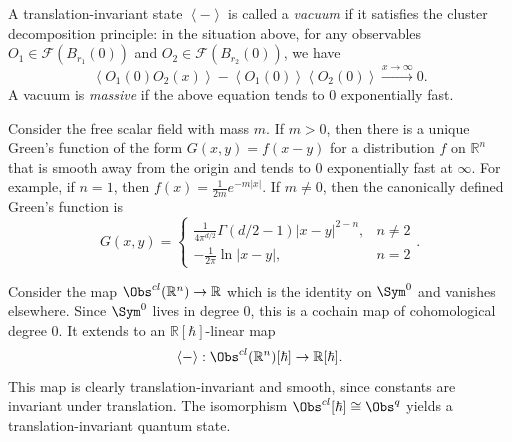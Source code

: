 \begin{definition}\label{dfn:4-9-2}
	A translation-invariant state $\left\langle - \right\rangle $ is called a \emph{vacuum} if it satisfies the cluster decomposition principle: in the situation above, for any observables $O_1\in \mathcal{F} (B_{r_1} (0))$ and $O_2\in \mathcal{F} (B_{r_2} (0))$, we have
	\[
		\left\langle O_1(0)O_2(x) \right\rangle -\left\langle O_1(0) \right\rangle \left\langle O_2(0) \right\rangle \xrightarrow{x\to \infty }0
	.\]
	A vacuum is \emph{massive} if the above equation tends to 0 exponentially fast.
\end{definition}

Consider the free scalar field with mass $m$. If $m>0$, then there is a unique Green's function of the form $G(x,y) = f(x-y)$ for a distribution $f$ on $\mathbb{R} ^n$ that is smooth away from the origin and tends to 0 exponentially fast at $\infty $. For example, if $n=1$, then $f(x) = \frac{1}{2m} e^{-m\left| x \right| } $. If $m\neq 0$, then the canonically defined Green's function is
\[
	G(x,y) =
	\begin{cases}
		\frac{1}{4\pi ^{d/2} } \Gamma (d/2 - 1)\left| x-y \right| ^{2-n} ,&n\neq 2\\
		-\frac{1}{2\pi } \ln \left| x-y \right| ,&n=2
	\end{cases}
.\]

Consider the map $\Obs^{cl} (\mathbb{R} ^n)\to \mathbb{R} $ which is the identity on $\Sym ^0$ and vanishes elsewhere. Since $\Sym ^0$ lives in degree 0, this is a cochain map of cohomological degree 0. It extends to an $\mathbb{R} [\hbar ]$-linear map
\[
	\left\langle - \right\rangle : \Obs^{cl} (\mathbb{R} ^n)[\hbar ] \to \mathbb{R} [\hbar ]
.\]
This map is clearly translation-invariant and smooth, since constants are invariant under translation. The isomorphism $\Obs^{cl} [\hbar ]\cong \Obs^{q} $ yields a translation-invariant quantum state.

